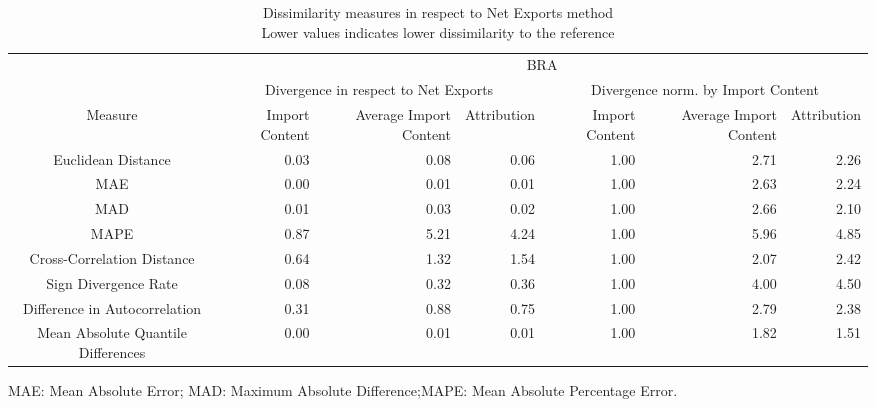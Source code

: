 \begin{table}[t]
\caption*{
{\large Dissimilarity measures in respect to Net Exports method} \\ 
{\small Lower values indicates lower dissimilarity to the reference}
} 
\fontsize{15.0pt}{18.0pt}\selectfont
\begin{tabular*}{\linewidth}{@{\extracolsep{\fill}}crrrrrr}
\toprule
 & \multicolumn{6}{c}{BRA} \\ 
\cmidrule(lr){2-7}
 & \multicolumn{3}{c}{Divergence in respect to Net Exports} & \multicolumn{3}{c}{Divergence norm. by Import Content} \\ 
\cmidrule(lr){2-4} \cmidrule(lr){5-7}
Measure & Import Content & Average Import Content & Attribution & Import Content & Average Import Content & Attribution \\ 
\midrule\addlinespace[2.5pt]
Euclidean Distance & 0.03 & 0.08 & 0.06 & 1.00 & 2.71 & 2.26 \\ 
MAE & 0.00 & 0.01 & 0.01 & 1.00 & 2.63 & 2.24 \\ 
MAD & 0.01 & 0.03 & 0.02 & 1.00 & 2.66 & 2.10 \\ 
MAPE & 0.87 & 5.21 & 4.24 & 1.00 & 5.96 & 4.85 \\ 
Cross-Correlation Distance & 0.64 & 1.32 & 1.54 & 1.00 & 2.07 & 2.42 \\ 
Sign Divergence Rate & 0.08 & 0.32 & 0.36 & 1.00 & 4.00 & 4.50 \\ 
Difference in Autocorrelation & 0.31 & 0.88 & 0.75 & 1.00 & 2.79 & 2.38 \\ 
Mean Absolute Quantile Differences & 0.00 & 0.01 & 0.01 & 1.00 & 1.82 & 1.51 \\ 
\bottomrule
\end{tabular*}
\begin{minipage}{\linewidth}
MAE: Mean Absolute Error; MAD: Maximum Absolute Difference;MAPE: Mean Absolute Percentage Error.\\
\end{minipage}
\end{table}

